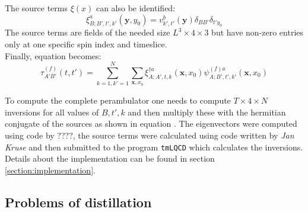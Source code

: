     The source terms $\xi(x)$ can also be identified:
    \begin{equation}
        \xi^a_{B;B',t',k'}(\textbf{y},y_0) =  v_{k',t'}^{b}(\textbf{y})\delta_{BB'}\delta_{t'y_0}
    \end{equation}
    The source terms are fields of the needed size $L^3 \times 4 \times 3$ but have non-zero entries only at one specific spin index and timeslice.\\
    
    Finally, equation  becomes:
    \begin{equation}\label{perambulator_with_inversion}
        \tau^{(f)}_{A'B'}(t,t') = \sum_{k=1,k'=1}^N \sum_{\textbf{x},x_0} \xi^{\dagger a}_{A;A',t,k}(\textbf{x},x_0) \psi^{(f)a}_{A;B',t',k'}(\textbf{x},x_0) 
    \end{equation}
    
    To compute the complete perambulator one needs to compute $T \times 4 \times N$ inversions for all values of $B,t',k$ and then multiply these with the hermitian conjugate of the sources as shown in equation . The eigenvectors were computed using code by ????, the source terms were calculated using code written by \textit{Jan Kruse} \cite{bachelor_thesis_jan} and then submitted to the program \verb+tmLQCD+ \cite{jansen_urbach_2009} which calculates the inversions. Details about the implementation can be found in section \ref{section:implementation}.
    
\subsection{Problems of distillation}
    